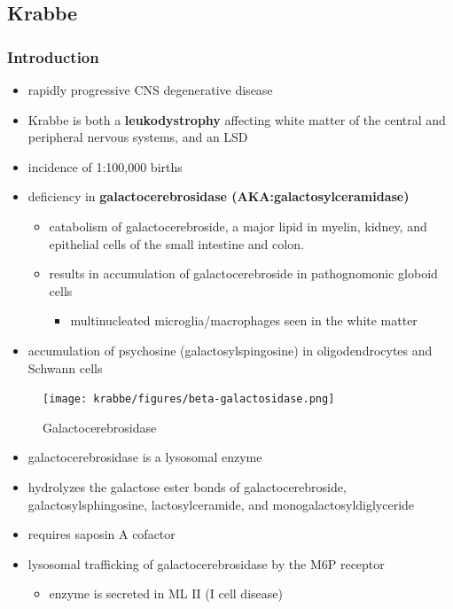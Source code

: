 \documentclass[12pt]{scrartcl}
\begin{document}
\subsection{Krabbe}
\label{sec:orgf451d38}
\subsubsection{Introduction}
\label{sec:org3c0b207}
\begin{itemize}
\item rapidly progressive CNS degenerative disease
\item Krabbe is both a \textbf{leukodystrophy} affecting white matter of the central
and peripheral nervous systems, and an LSD
\item incidence of 1:100,000 births
\item deficiency in \textbf{galactocerebrosidase (AKA:galactosylceramidase)} 
\begin{itemize}
\item catabolism of galactocerebroside, a major lipid in myelin, kidney, and epithelial cells of the small intestine and colon.
\item results in accumulation of galactocerebroside in pathognomonic globoid cells
\begin{itemize}
\item multinucleated microglia/macrophages seen in the white matter
\end{itemize}
\end{itemize}
\item accumulation of psychosine (galactosylspingosine) in oligodendrocytes and Schwann cells
\end{itemize}

\begin{figure}[htbp]
\centering
\texttt{[image: krabbe/figures/beta-galactosidase.png]}
\caption{\label{fig:org3ed34e6}Galactocerebrosidase}
\end{figure}

\begin{itemize}
\item galactocerebrosidase is a lysosomal enzyme
\item hydrolyzes the galactose ester bonds of galactocerebroside, galactosylsphingosine, lactosylceramide, and monogalactosyldiglyceride
\item requires saposin A cofactor
\item lysosomal trafficking of galactocerebrosidase by the M6P receptor
\begin{itemize}
\item enzyme is secreted in ML II (I cell disease)
\end{itemize}
\end{itemize}
\end{document}
